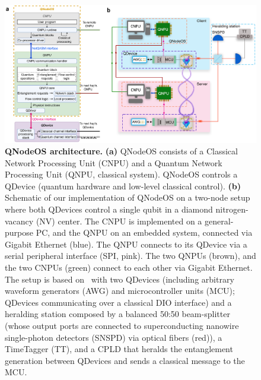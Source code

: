 \begin{figure}[t]
\centering
\includegraphics[width=1.0\textwidth]{figures/qnodeos/main/fig2/fig2.png}
\caption{\textbf{QNodeOS architecture.}
\textbf{(a)}
QNodeOS consists of a Classical Network Processing Unit (CNPU) and a Quantum Network Processing Unit (QNPU, classical system).
QNodeOS controls a QDevice (quantum hardware and low-level classical control).
\textbf{(b)}
Schematic of our implementation of QNodeOS on a two-node setup where both QDevices control a single qubit in a diamond nitrogen-vacancy (NV) center.
The CNPU is implemented on a general-purpose PC, and the QNPU on an embedded system, connected via Gigabit Ethernet (blue).
The QNPU connects to its QDevice via a serial peripheral interface (SPI, pink).
The two QNPUs (brown), and the two CNPUs (green) connect to each other via Gigabit Ethernet.
The setup is based on~\cite{pompili_2022_experimental} with two QDevices (including arbitrary waveform generators (AWG) and microcontroller units (MCU); QDevices communicating over a classical DIO interface) and a heralding station composed by a balanced 50:50 beam-splitter (whose output ports are connected to superconducting nanowire single-photon detectors (SNSPD) via optical fibers (red)), a TimeTagger (TT), and a \acf{CPLD} that heralds the entanglement generation between QDevices and sends a classical message to the MCU.}
\label{qnodeos:fig:fig2}
\end{figure}

